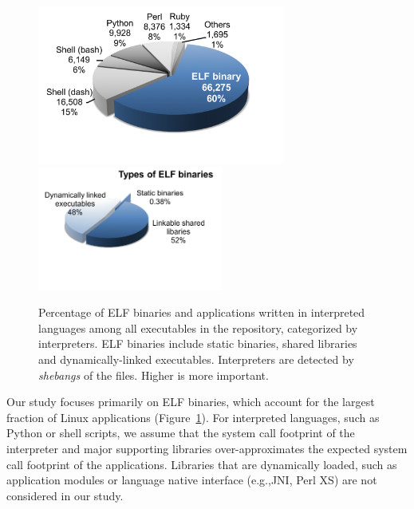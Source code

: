 \begin{figure}[t!]
\centering
\includegraphics[width=3.2in]{syspop/figures/executable-type.pdf}\includegraphics[width=2.4in]{syspop/figures/elf-binary-type.pdf}
\vspace{-0.5in}
\footnotesize
\caption[Types of executables included in the study of Linux API usage.]
{Percentage of ELF binaries and applications written in interpreted languages among all executables in the \osdist{} repository, categorized by interpreters. ELF binaries include static binaries, shared libraries and dynamically-linked executables. Interpreters are detected by {\em shebangs} of the files. Higher is more important.}
\label{fig:syspop:executable-type}
\end{figure}

Our study focuses primarily on ELF binaries, which account for the largest fraction of Linux applications
(Figure~\ref{fig:syspop:executable-type}).
For interpreted languages, such as Python or shell scripts,
we assume that the system call footprint of the interpreter and major supporting libraries over-approximates the expected system call footprint of the applications.
Libraries that are dynamically loaded, such as application modules or
language native interface (e.g.,JNI, Perl XS) are not considered in our study. 


